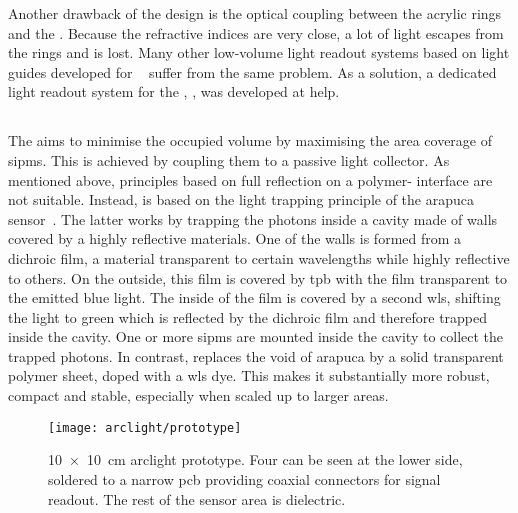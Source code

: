Another drawback of the design is the optical coupling between the acrylic rings and the \lar{}.
Because the refractive indices are very close, a lot of light escapes from the rings and is lost.
Many other low-volume light readout systems based on light guides developed for \lar{}~\cite{lar_lro1, lar_lro2, lar_lro3, lar_lro4, lar_lro5, lar_lro6, lar_lro7} suffer from the same problem.
As a solution, a dedicated light readout system for the \AC{}, \AL{}, was developed at \gls{help}.


\subsection{}
\label{sec:studies_light-col_al}

The \AL{} aims to minimise the occupied volume by maximising the area coverage of \glspl{sipm}.
This is achieved by coupling them to a passive light collector.
As mentioned above, principles based on full reflection on a polymer-\lar{} interface are not suitable.
Instead, \AL{} is based on the light trapping principle of the \gls{arapuca} sensor~\cite{arapuca}.
The latter works by trapping the photons inside a cavity made of walls covered by a highly reflective materials.
One of the walls is formed from a dichroic film, a material transparent to certain wavelengths while highly reflective to others.
On the outside, this film is covered by \gls{tpb} with the film transparent to the emitted blue light.
The inside of the film is covered by a second \gls{wls}, shifting the light to green which is reflected by the dichroic film and therefore trapped inside the cavity.
One or more \glspl{sipm} are mounted inside the cavity to collect the trapped photons.
In contrast, \AL{} replaces the void of \gls{arapuca} by a solid transparent polymer sheet, doped with a \gls{wls} dye.
This makes it substantially more robust, compact and stable, especially when scaled up to larger areas.

\begin{figure}[htb]
	\centering
	\texttt{[image: arclight/prototype]}
	\caption[\SI{10 x 10}{\centi\metre}  prototype]{%
		\SI{10 x 10}{\centi\metre} \acrshort{arclight} prototype.
		Four  can be seen at the lower side, soldered to a narrow \acrshort{pcb} providing coaxial connectors for signal readout.
		The rest of the sensor area is dielectric.
	}
	\label{fig:arclight_prototype}
\end{figure}

